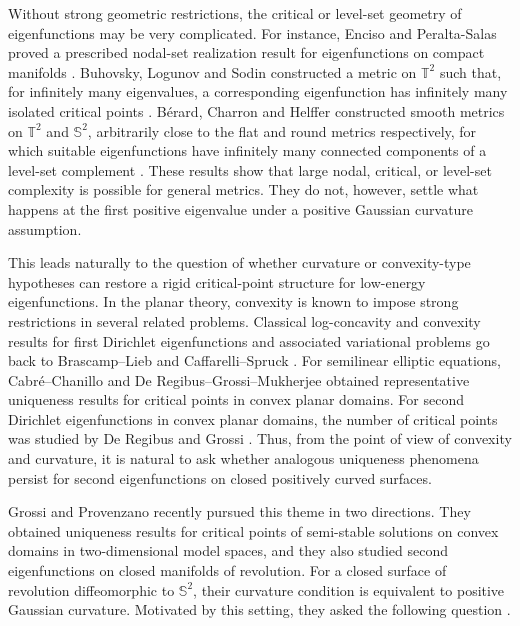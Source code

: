 \documentclass[11pt]{amsart}
\numberwithin{equation}{section}
\begin{document}
Without strong geometric restrictions, the critical or level-set geometry of
eigenfunctions may be very complicated.  For instance, Enciso and Peralta-Salas
proved a prescribed nodal-set realization result for eigenfunctions on compact
manifolds \cite{EncisoPeraltaSalas}.  Buhovsky, Logunov and Sodin constructed a
metric on $\mathbb T^2$ such that, for infinitely many eigenvalues, a
corresponding eigenfunction has infinitely many isolated critical points
\cite{BuhovskyLogunovSodin}.  B\'erard, Charron and Helffer constructed smooth
metrics on $\mathbb T^2$ and $\mathbb S^2$, arbitrarily close to the flat and
round metrics respectively, for which suitable eigenfunctions have infinitely
many connected components of a level-set complement
\cite{BerardCharronHelffer}.  These results show that large nodal, critical, or
level-set complexity is possible for general metrics.  They do not, however,
settle what happens at the first positive eigenvalue under a positive Gaussian
curvature assumption.

This leads naturally to the question of whether curvature or convexity-type
hypotheses can restore a rigid critical-point structure for low-energy
eigenfunctions.  In the planar theory, convexity is known to impose strong
restrictions in several related problems.  Classical log-concavity and convexity
results for first Dirichlet eigenfunctions and associated variational problems
go back to Brascamp--Lieb \cite{BrascampLieb1976} and Caffarelli--Spruck
\cite{CaffarelliSpruck1982}.  For semilinear elliptic equations,
Cabr\'e--Chanillo \cite{CabreChanillo1998} and
De Regibus--Grossi--Mukherjee \cite{DeRegibusGrossiMukherjee2021} obtained
representative uniqueness results for critical points in convex planar domains.
For second Dirichlet eigenfunctions in convex planar domains, the number of
critical points was studied by De Regibus and Grossi
\cite{DeRegibusGrossi2022}.  Thus, from the point of view of convexity and
curvature, it is natural to ask whether analogous uniqueness phenomena persist
for second eigenfunctions on closed positively curved surfaces.

Grossi and Provenzano \cite{GrossiProvenzanoPublished} recently pursued this
theme in two directions.  They obtained uniqueness results for critical points of
semi-stable solutions on convex domains in two-dimensional model spaces, and
they also studied second eigenfunctions on closed manifolds of revolution.  For a
closed surface of revolution diffeomorphic to $\mathbb S^2$, their curvature
condition is equivalent to positive Gaussian curvature.  Motivated by this
setting, they asked the following question
\cite[Open Question~3.19]{GrossiProvenzanoPublished}.
\end{document}
